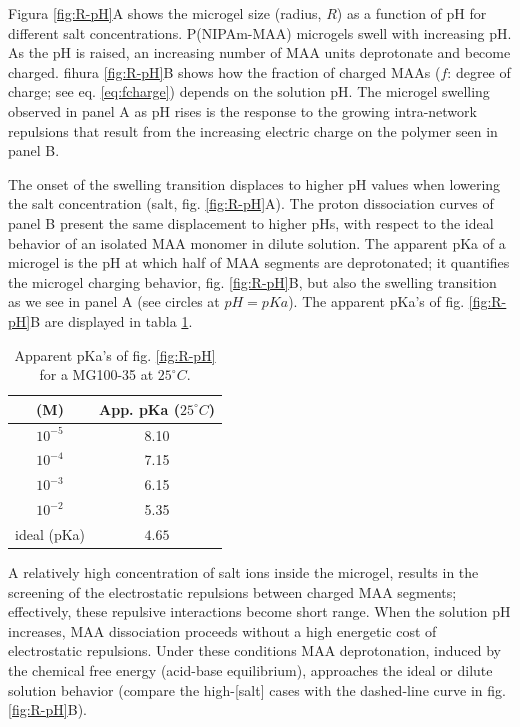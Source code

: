 Figura \ref{fig:R-pH}A shows the microgel size (radius, $R$) as a function of pH for different salt concentrations.
P(NIPAm-MAA) microgels swell with increasing pH.
As the pH is raised, an increasing number of MAA units deprotonate and become charged.
fihura \ref{fig:R-pH}B shows how the fraction of charged MAAs ($f$: degree of charge; see eq. \ref{eq:fcharge}) depends on the solution pH.
The microgel swelling observed in panel A as pH rises is the response to the growing intra-network repulsions that result from the increasing electric charge on the polymer seen in panel B.



The onset of the swelling transition displaces to higher pH values when lowering the salt concentration (salt, fig. \ref{fig:R-pH}A).
The proton dissociation curves of panel B present the same displacement to higher pHs, with respect to the ideal behavior of an isolated MAA monomer in dilute solution.
The apparent pKa of a microgel is the pH at which half of MAA segments are deprotonated;
it quantifies the microgel charging behavior, fig. \ref{fig:R-pH}B, but also the swelling transition as we see in panel A (see circles at $pH=pKa$).
The apparent pKa's of fig. \ref{fig:R-pH}B are displayed in tabla \ref{table:pKa_app}.


\begin{table}[!htb]
\small
  \begin{tabular}{|cc|}
    \hline
      [salt] (M)& App. pKa ($25 ^\circ C$)  \\
      \hline
    $10^{-5}$ & 8.10  \\
    $10^{-4}$ & 7.15 \\
    $10^{-3}$ & 6.15 \\
    $10^{-2}$ & 5.35 \\
    ideal (pKa) &  $4.65$  \\
    \hline
  \end{tabular}
 \caption{Apparent pKa's of fig. \ref{fig:R-pH} for a MG100-35 at $25 ^\circ C$.}
\label{table:pKa_app} 
\end{table}



A relatively high concentration of salt ions inside the microgel, results in the screening of the electrostatic repulsions between charged MAA segments;
effectively, these repulsive interactions become short range.
When the solution pH increases, MAA dissociation proceeds without a high energetic cost of electrostatic repulsions.
Under these conditions MAA deprotonation, induced by the chemical free energy (acid-base equilibrium), approaches the ideal or dilute solution behavior (compare the high-[salt] cases with the dashed-line curve in fig. \ref{fig:R-pH}B).



